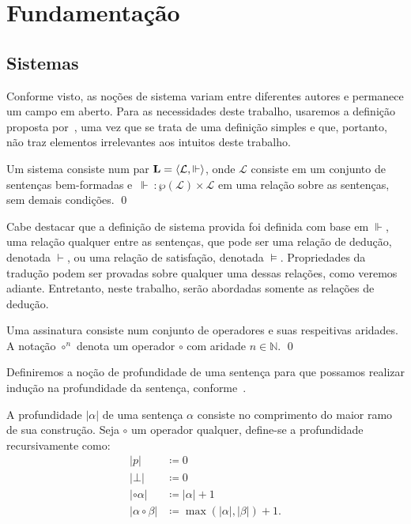 \chapter{Fundamentação}

\section{Sistemas}

Conforme visto, as noções de sistema variam entre diferentes autores e permanece um campo em aberto. Para as necessidades deste trabalho, usaremos a definição proposta por~\cite{Beziau}, uma vez que se trata de uma definição simples e que, portanto, não traz elementos irrelevantes aos intuitos deste trabalho.

\begin{definition}[Sistema]
    Um sistema consiste num par $\mathbf{L} = \langle\mathcal{L}, \Vdash\rangle$, onde $\mathcal{L}$ consiste em um conjunto de sentenças bem-formadas e $\, \Vdash \: : \wp(\mathcal{L}) \times \mathcal{L} $ em uma relação sobre as sentenças, sem demais condições.
    \qed
\end{definition}

Cabe destacar que a definição de sistema provida foi definida com base em $\Vdash$, uma relação qualquer entre as sentenças, que pode ser uma relação de dedução, denotada $\vdash$, ou uma relação de satisfação, denotada $\vDash$. Propriedades da tradução podem ser provadas sobre qualquer uma dessas relações, como veremos adiante. Entretanto, neste trabalho, serão abordadas somente as relações de dedução.

\begin{definition}[Assinatura]
    Uma assinatura consiste num conjunto de operadores e suas respeitivas aridades. A notação $\circ^n$ denota um operador $\circ$ com aridade $n \in \mathbb{N}$.
    \qed
\end{definition}

Definiremos a noção de profundidade de uma sentença para que possamos realizar indução na profundidade da sentença, conforme~\cite{Troelstra}.

\begin{definition}[Profundidade]
    A profundidade $|\alpha|$ de uma sentença $\alpha$ consiste no comprimento do maior ramo de sua construção. Seja $\circ$ um operador qualquer, define-se a profundidade recursivamente como:
    \begin{align*}
        |p|                  & \coloneqq 0                           \\
        |\bot|               & \coloneqq 0                           \\
        |\circ \alpha|       & \coloneqq |\alpha| + 1                \\
        |\alpha \circ \beta| & \coloneqq \max(|\alpha|, |\beta|) + 1.
        \tag*{\qed} 
    \end{align*}
\end{definition}


